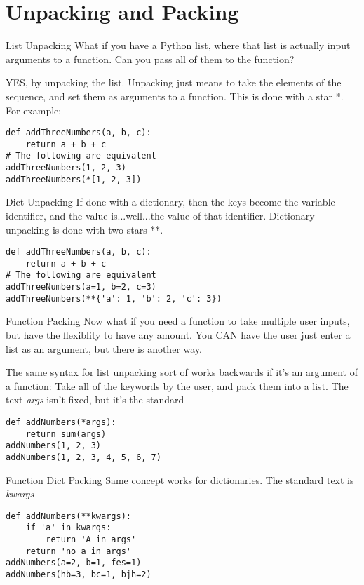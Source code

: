 \section{Unpacking and Packing}
\begin{frame}[fragile]{List Unpacking}
  What if you have a Python list, where that list is actually input arguments to a function. Can you pass all of them to the function?\pause

  YES, by unpacking the list. Unpacking just means to take the elements of the sequence, and set them as arguments to a function. This is done with a star *. For example:
  \begin{verbatim}
def addThreeNumbers(a, b, c):
    return a + b + c
# The following are equivalent
addThreeNumbers(1, 2, 3)
addThreeNumbers(*[1, 2, 3])
  \end{verbatim}
\end{frame}

\begin{frame}[containsverbatim]{Dict Unpacking}
  If done with a dictionary, then the keys become the variable identifier, and the value is...well...the value of that identifier. Dictionary unpacking is done with two stars **.
  \begin{verbatim}
def addThreeNumbers(a, b, c):
    return a + b + c
# The following are equivalent
addThreeNumbers(a=1, b=2, c=3)
addThreeNumbers(**{'a': 1, 'b': 2, 'c': 3})
  \end{verbatim}
\end{frame}

\begin{frame}[fragile]{Function Packing}
  Now what if you need a function to take multiple user inputs, but have the flexiblity to have any amount. You CAN have the user just enter a list as an argument, but there is another way.\pause

  The same syntax for list unpacking sort of works backwards if it's an argument of a function: Take all of the keywords by the user, and pack them into a list. The text \textit{args} isn't fixed, but it's the standard

  \begin{verbatim}
def addNumbers(*args):
    return sum(args)
addNumbers(1, 2, 3)
addNumbers(1, 2, 3, 4, 5, 6, 7)
  \end{verbatim}
\end{frame}


\begin{frame}[containsverbatim]{Function Dict Packing}
  Same concept works for dictionaries. The standard text is \textit{kwargs}

  \begin{verbatim}
def addNumbers(**kwargs):
    if 'a' in kwargs:
        return 'A in args'
    return 'no a in args'
addNumbers(a=2, b=1, fes=1)
addNumbers(hb=3, bc=1, bjh=2)
  \end{verbatim}
\end{frame}

